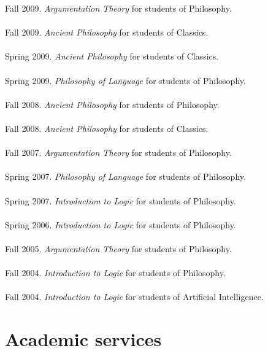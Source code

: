 \documentclass[a4paper,11pt]{article}
\begin{document}
Fall 2009. \emph{Argumentation Theory} for students of
Philosophy.\\\\
Fall 2009. \emph{Ancient Philosophy} for students of Classics.\\\\
Spring 2009. \emph{Ancient Philosophy} for students of Classics.\\\\
Spring 2009. \emph{Philosophy of Language} for students of Philosophy.\\\\
Fall 2008. \emph{Ancient Philosophy} for students of Philosophy.\\\\
Fall 2008. \emph{Ancient Philosophy} for students of Classics.\\\\
Fall 2007. \emph{Argumentation Theory} for students of
Philosophy.\\\\
Spring 2007. \emph{Philosophy of Language} for students of Philosophy.\\\\
Spring 2007. \emph{Introduction to Logic} for students of Philosophy.\\\\
Spring 2006. \emph{Introduction to Logic} for students of Philosophy.\\\\
Fall 2005. \emph{Argumentation Theory} for students of
Philosophy.\\\\
Fall 2004. \emph{Introduction to Logic} for students of Philosophy.
\\\\ 
Fall 2004. \emph{Introduction to Logic} for students of Artificial
Intelligence.\\






\section*{Academic services%
}
\end{document}
